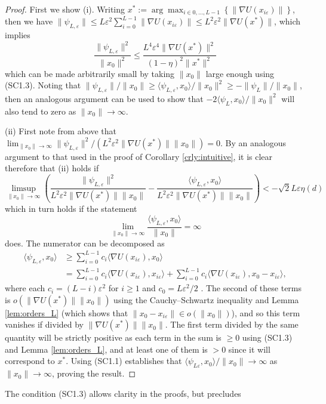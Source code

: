 \documentclass[bj,numbers,noshowframe]{imsart}
\newcommand{\e}{\varepsilon}
\theoremstyle{definition}
\theoremstyle{plain}
\theoremstyle{definition}
\begin{document}
\begin{proof}
First we show (i). Writing $x^{*}:=\arg\max_{i\in{0,...,L-1}}\left\{ \|\nabla U(x_{i\e})\|\right\} $,
then we have $\|\psi_{L,\e}\|\leq L\e^{2}\sum_{i=0}^{L-1}\|\nabla U(x_{i\e})\|\leq L^{2}\e^{2}\|\nabla U(x^{*})\|$,
which implies
\[
\frac{\|\psi_{L,\e}\|^{2}}{\|x_{0}\|^{2}}\leq\frac{L^{4}\e^{4}\|\nabla U(x^{*})\|^{2}}{(1-\eta)^{2}\|x^{*}\|^{2}}
\]
which can be made arbitrarily small by taking $\|x_{0}\|$ large enough
using (SC1.3). Noting that $\|\psi_{L,\e}\|/\|x_{0}\|\geq\langle\psi_{L,\e},x_{0}\rangle/\|x_{0}\|^{2}\geq-\|\psi_{L}\|/\|x_{0}\|$,
then an analogous argument can be used to show that $-2\langle\psi_{L},x_{0}\rangle/\|x_{0}\|^{2}$
will also tend to zero as $\|x_{0}\|\to\infty$. 

(ii) First note from above that $\lim_{\|x_{0}\|\to\infty}\|\psi_{L,\e}\|^{2}/\left(L^{2}\e^{2}\|\nabla U(x^{*})\|\|x_{0}\|\right)=0$.
By an analogous argument to that used in the proof of Corollary \ref{crly:intuitive},
it is clear therefore that (ii) holds if
\[
\limsup_{\|x_{0}\|\to\infty}\left(\frac{\|\psi_{L,\e}\|^{2}}{L^{2}\e^{2}\|\nabla U(x^{*})\|\|x_{0}\|}-\frac{\langle\psi_{L,\e},x_{0}\rangle}{L^{2}\e^{2}\|\nabla U(x^{*})\|\|x_{0}\|}\right)< -\sqrt{2}L\e \eta(d)
\]
which in turn holds if the statement
\[
\lim_{\|x_{0}\|\to\infty}\frac{\langle\psi_{L,\e},x_{0}\rangle}{\|x_{0}\|} = \infty
\]
does. The numerator can be decomposed as
\begin{align*}
\langle\psi_{L,\e},x_{0}\rangle &\geq \sum_{i=0}^{L-1}c_{i}\langle\nabla U(x_{i\e}),x_{0}\rangle \\
&=\sum_{i=0}^{L-1}c_{i}\langle\nabla U(x_{i\e}),x_{i\e}\rangle+\sum_{i=0}^{L-1}c_{i}\langle\nabla U(x_{i\e}),x_{0}-x_{i\e}\rangle,
\end{align*}
where each $c_{i}=(L-i)\e^{2}$ for $i\geq1$ and $c_{0}=L\e^{2}/2$
. The second of these terms is $o(\|\nabla U(x^*)\|\|x_{0}\|)$ using the Cauchy--Schwartz
inequality and Lemma \ref{lem:orders_L} (which shows that $\|x_{0}-x_{i\e}\|\in o(\|x_{0}\|)$), and so this term
vanishes if divided by $\|\nabla U(x^{*})\|\|x_{0}\|$. The first term divided by the same quantity will be strictly positive
as each term in the sum is $\geq0$ using (SC1.3) and Lemma \ref{lem:orders_L},
and at least one of them is $>0$ since it will correspond to $x^{*}$. Using (SC1.1) establishes that $\langle \psi_{L\e},x_0\rangle / \|x_0\| \to \infty$ as $\|x_0\|\to\infty$, proving the result.
\end{proof}
The condition (SC1.3) allows clarity in the proofs, but precludes
\end{document}

